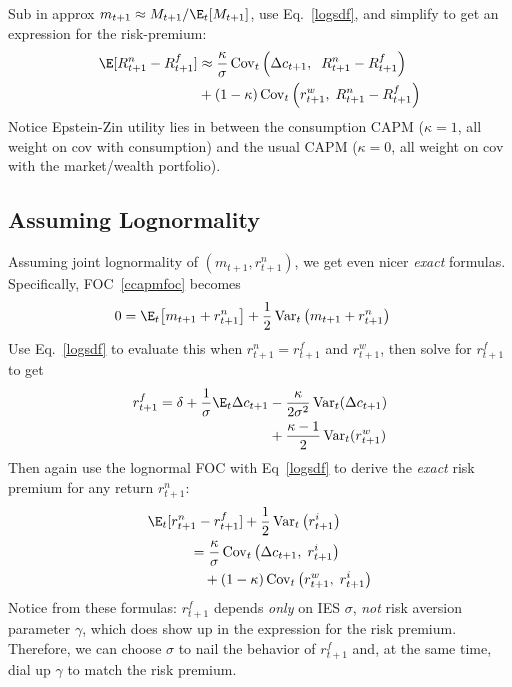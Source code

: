 \documentclass[12pt]{article}
\theoremstyle{plain}
\theoremstyle{definition}
\theoremstyle{remark}
\newcommand{\Cov}{\operatorname{Cov}}
\newcommand{\Var}{\operatorname{Var}}
\begin{document}
\begin{multicols*}{2}
Sub in approx $m_{t+1}\approx M_{t+1}/\E_t[M_{t+1}]$, use
Eq.~\ref{logsdf}, and simplify to get an expression for the
risk-premium:
\begin{align*}
  \E[R_{t+1}^n-R_{t+1}^f]
  &\approx
  \frac{\kappa}{\sigma}\Cov_t\left(
  \Delta c_{t+1},\;
  \;R_{t+1}^n-R_{t+1}^f
  \right)
  \\
  &
  +(1-\kappa)
  \Cov_t\left(
  r_{t+1}^w,
  \;R_{t+1}^n-R_{t+1}^f
  \right)
\end{align*}
Notice Epstein-Zin utility lies in between the consumption CAPM
($\kappa=1$, all weight on cov with consumption) and the usual
CAPM ($\kappa=0$, all weight on cov with the market/wealth portfolio).



\subsection{Assuming Lognormality}

Assuming joint lognormality of $(m_{t+1},r_{t+1}^n)$, we get even nicer
\emph{exact} formulas.  Specifically, FOC~\ref{ccapmfoc} becomes
\begin{align}
  0 &=
  \E_t\big[m_{t+1}+r_{t+1}^n\big]
  +
  \frac{1}{2}\Var_t\big(
  m_{t+1}+r_{t+1}^n\big)
  \notag
\end{align}
Use Eq.~\ref{logsdf} to evaluate this when $r^n_{t+1}=r^f_{t+1}$ and
$r^w_{t+1}$, then solve for $r^f_{t+1}$ to get
\begin{align*}
  r_{t+1}^f
  =
  \delta
  +\frac{1}{\sigma}\E_t\Delta c_{t+1}
  &-
  \frac{\kappa}{2\sigma^2}
  \Var_t(\Delta c_{t+1})
  \\
  &
  +
  \frac{\kappa-1}{2}
  \Var_t(r_{t+1}^w)
\end{align*}
Then again use the lognormal FOC with Eq~\ref{logsdf} to derive the
\emph{exact} risk premium for any return $r_{t+1}^n$:
\begin{align*}
  &\E_t[r_{t+1}^n - r^f_{t+1}]
  +\frac{1}{2}
  \Var_t\big(r_{t+1}^i\big)
  \\
  &
  \qquad\quad
  =
  \frac{\kappa}{\sigma}
  \Cov_t\left(\Delta c_{t+1},\; r_{t+1}^i\right)
  \\
  &
  \qquad\quad\quad
  +(1-\kappa)\Cov_t\left( r_{t+1}^w,\; r_{t+1}^i\right)
\end{align*}
Notice from these formulas: $r^f_{t+1}$ depends \emph{only} on IES
$\sigma$, \emph{not} risk aversion parameter $\gamma$, which does show
up in the expression for the risk premium. Therefore, we can choose
$\sigma$ to nail the behavior of $r^f_{t+1}$ and, at the same time, dial
up $\gamma$ to match the risk premium.




\end{multicols*}
\end{document}
